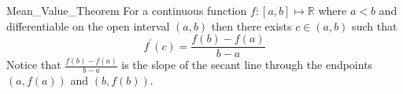 \documentclass[preview]{standalone}
\begin{document}
\begin{theo*}{Mean\_Value\_Theorem}
  For a continuous function $f: \left[ a,b \right] \mapsto \mathbb{R} $ where $a < b$ and differentiable on the open interval $ \left( a, b \right)$ then there exists $c \in \left( a, b \right)$ such that 
  \[
  f ^{\prime}\left(c\right) = \frac{f\left(b\right)  -  f\left(a\right)}{b  -  a}
  \]
  Notice that  $ \frac{f\left(b\right)  -  f\left(a\right)}{b  -  a}$ is the slope of the secant line through the endpoints $ \left(  a, f\left(a\right) \right)$ and $ \left( b, f\left(b\right) \right)$.
\end{theo*}
\end{document}
